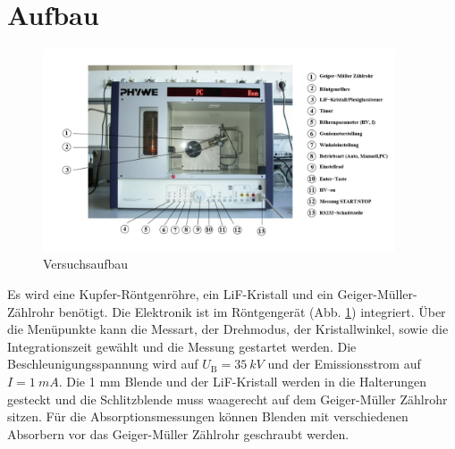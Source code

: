 \section{Aufbau}
\label{sec:aufbau}
\begin{figure}
    \centering
    \includegraphics[height=6.0cm]{data/abb4.jpg}
    \caption{Versuchsaufbau \cite{V602}}
    \label{fig:abb4}
\end{figure}
\noindent
Es wird eine Kupfer-Röntgenröhre, ein LiF-Kristall und ein Geiger-Müller-Zählrohr benötigt.
Die Elektronik ist im Röntgengerät (Abb. \ref{fig:abb4}) integriert.
Über die Menüpunkte kann die Messart, der Drehmodus, der Kristallwinkel, sowie die Integrationszeit gewählt und die Messung gestartet werden.
Die Beschleunigungsspannung wird auf $U_\text{B} = \SI{35}{kV}$ und der Emissionsstrom auf $I = \SI{1}{mA}$.
Die 1 mm Blende und der LiF-Kristall werden in die Halterungen gesteckt und die Schlitzblende muss waagerecht auf dem Geiger-Müller Zählrohr sitzen.
Für die Absorptionsmessungen können Blenden mit verschiedenen Absorbern vor das Geiger-Müller Zählrohr geschraubt werden.

